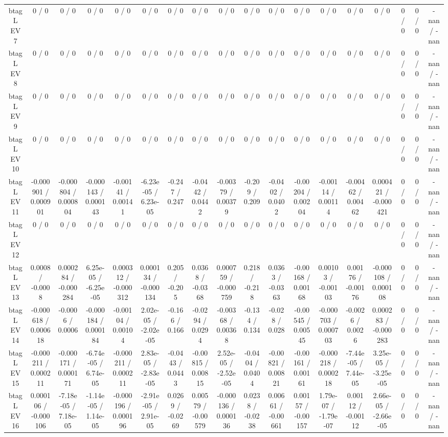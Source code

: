 \documentclass[10pt]{article}
\begin{document}
\begin{table}[htbp]
\begin{center}
\begin{tabular}{|c|c|c|c|c|c|c|c|c|c|c|c|c|c|c|c|c|c|}
  btag L EV 7 & 0 / 0 & 0 / 0 & 0 / 0 & 0 / 0 & 0 / 0 & 0 / 0 & 0 / 0 & 0 / 0 & 0 / 0 & 0 / 0 & 0 / 0 & 0 / 0 & 0 / 0 & 0 / 0 & 0 / 0 & 0 / 0 & -nan / -nan \\ 
  btag L EV 8 & 0 / 0 & 0 / 0 & 0 / 0 & 0 / 0 & 0 / 0 & 0 / 0 & 0 / 0 & 0 / 0 & 0 / 0 & 0 / 0 & 0 / 0 & 0 / 0 & 0 / 0 & 0 / 0 & 0 / 0 & 0 / 0 & -nan / -nan \\ 
  btag L EV 9 & 0 / 0 & 0 / 0 & 0 / 0 & 0 / 0 & 0 / 0 & 0 / 0 & 0 / 0 & 0 / 0 & 0 / 0 & 0 / 0 & 0 / 0 & 0 / 0 & 0 / 0 & 0 / 0 & 0 / 0 & 0 / 0 & -nan / -nan \\ 
  btag L EV 10 & 0 / 0 & 0 / 0 & 0 / 0 & 0 / 0 & 0 / 0 & 0 / 0 & 0 / 0 & 0 / 0 & 0 / 0 & 0 / 0 & 0 / 0 & 0 / 0 & 0 / 0 & 0 / 0 & 0 / 0 & 0 / 0 & -nan / -nan \\ 
  btag L EV 11 & -0.000901 / 0.000901 & -0.000804 / 0.000804 & -0.000143 / 0.000143 & -0.00141 / 0.00141 & -6.23e-05 / 6.23e-05 & -0.247 / 0.247 & -0.0442 / 0.0442 & -0.00379 / 0.00379 & -0.209 / 0.209 & -0.0402 / 0.0402 & -0.00204 / 0.00204 & -0.00114 / 0.00114 & -0.00462 / 0.00462 & 0.000421 / -0.000421 & 0 / 0 & 0 / 0 & -nan / -nan \\ 
  btag L EV 12 & 0 / 0 & 0 / 0 & 0 / 0 & 0 / 0 & 0 / 0 & 0 / 0 & 0 / 0 & 0 / 0 & 0 / 0 & 0 / 0 & 0 / 0 & 0 / 0 & 0 / 0 & 0 / 0 & 0 / 0 & 0 / 0 & -nan / -nan \\ 
  btag L EV 13 & 0.0008 / -0.0008 & 0.000284 / -0.000284 & 6.25e-05 / -6.25e-05 & 0.000312 / -0.000312 & 0.000134 / -0.000134 & 0.205 / -0.205 & 0.0368 / -0.0368 & 0.000759 / -0.000759 & 0.218 / -0.218 & 0.0363 / -0.0363 & -0.00168 / 0.00168 & 0.00103 / -0.00103 & 0.00176 / -0.00176 & -0.000108 / 0.000108 & 0 / 0 & 0 / 0 & -nan / -nan \\ 
  btag L EV 14 & -0.000618 / 0.000618 & -0.0006 / 0.0006 & -0.000184 / 0.000184 & -0.00104 / 0.00104 & 2.02e-05 / -2.02e-05 & -0.166 / 0.166 & -0.0294 / 0.0294 & -0.00368 / 0.00368 & -0.134 / 0.134 & -0.028 / 0.028 & -0.00545 / 0.00545 & -0.000703 / 0.000703 & -0.0026 / 0.0026 & 0.000283 / -0.000283 & 0 / 0 & 0 / 0 & -nan / -nan \\ 
  btag L EV 15 & -0.000211 / 0.000211 & -0.000171 / 0.000171 & -6.74e-05 / 6.74e-05 & -0.000211 / 0.000211 & 2.83e-05 / -2.83e-05 & -0.0443 / 0.0443 & -0.00815 / 0.00815 & 2.52e-05 / -2.52e-05 & -0.0404 / 0.0404 & -0.00821 / 0.00821 & -0.00161 / 0.00161 & -0.000218 / 0.000218 & -7.44e-05 / 7.44e-05 & 3.25e-05 / -3.25e-05 & 0 / 0 & 0 / 0 & -nan / -nan \\ 
  btag L EV 16 & 0.000106 / -0.000106 & -7.18e-05 / 7.18e-05 & -1.14e-05 / 1.14e-05 & -0.000196 / 0.000196 & -2.91e-05 / 2.91e-05 & 0.0269 / -0.0269 & 0.00579 / -0.00579 & -0.000136 / 0.000136 & 0.0238 / -0.0238 & 0.00661 / -0.00661 & 0.00157 / -0.00157 & 1.79e-07 / -1.79e-07 & 0.00112 / -0.00112 & 2.66e-05 / -2.66e-05 & 0 / 0 & 0 / 0 & -nan / -nan \\ 

\end{tabular}
\end{center}
\end{table}
\end{document}
